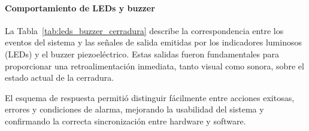 \vspace{0.3cm}

\paragraph{Comportamiento de LEDs y buzzer}

La Tabla~\ref{tab:leds_buzzer_cerradura} describe la correspondencia entre los eventos del sistema 
y las señales de salida emitidas por los indicadores luminosos (LEDs) y el buzzer piezoeléctrico.  
Estas salidas fueron fundamentales para proporcionar una retroalimentación inmediata, tanto visual como sonora, 
sobre el estado actual de la cerradura.

\begin{table}[H]
\centering
{}
\caption{Relación entre eventos del sistema y las salidas de retroalimentación (LEDs y buzzer). Fuente: elaboración propia.}
\label{tab:leds_buzzer_cerradura}
\end{table}

El esquema de respuesta permitió distinguir fácilmente entre acciones exitosas, errores y condiciones de alarma, 
mejorando la usabilidad del sistema y confirmando la correcta sincronización entre hardware y software.
